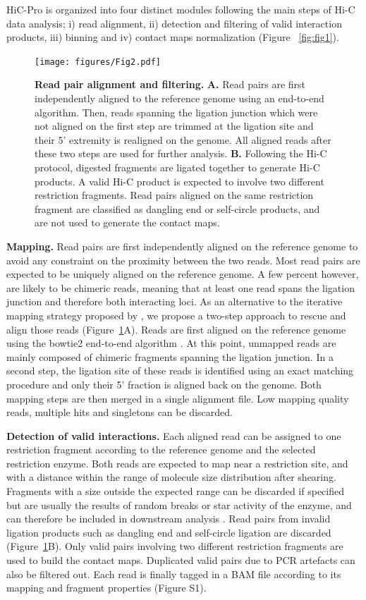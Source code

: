 HiC-Pro is organized into four distinct modules following the main steps of
Hi-C data analysis; i) read alignment, ii) detection and filtering of valid
interaction products, iii) binning and iv) contact maps normalization (Figure
~\ref{fig:fig1}).

\begin{figure}
\texttt{[image: figures/Fig2.pdf]}
\caption{\textbf{Read pair alignment and filtering.} \textbf{A.} Read pairs are first
independently aligned to the reference genome using an end-to-end algorithm.
Then, reads spanning the ligation junction which were not aligned on the first
step are trimmed at the ligation site and their 5’ extremity is realigned on
the genome. All aligned reads after these two steps are used for further
analysis. \textbf{B.} Following the Hi-C protocol, digested fragments are ligated
together to generate Hi-C products. A valid Hi-C product is expected to
involve two different restriction fragments. Read pairs aligned on the same
restriction fragment are classified as dangling end or self-circle products,
and are not used to generate the contact maps.}
\label{fig:fig2}
\end{figure}



\textbf{Mapping.} Read pairs are first independently aligned on the reference
genome to avoid any constraint on the proximity between the two reads. Most
read pairs are expected to be uniquely aligned on the reference genome. A few
percent however, are likely to be chimeric reads, meaning that at least one
read spans the ligation junction and therefore both interacting loci. As an
alternative to the iterative mapping strategy proposed by
\citet{imakaev:iterative},
we propose a two-step approach to rescue and align those reads
(Figure~\ref{fig:fig2}A).
Reads are first aligned on the reference genome using the bowtie2 end-to-end
algorithm \citep{langmead:fast}. At this point, unmapped reads are mainly composed of chimeric
fragments spanning the ligation junction. In a second step, the ligation site
of these reads is identified using an exact matching procedure and only their
5’ fraction is aligned back on the genome. Both mapping steps are then merged
in a single alignment file. Low mapping quality reads, multiple hits and
singletons can be discarded.

\textbf{Detection of valid interactions.} Each aligned read can be assigned to
one restriction fragment according to the reference genome and the selected
restriction enzyme. Both reads are expected to map near a restriction site,
and with a distance within the range of molecule size distribution after
shearing. Fragments with a size outside the expected range can be discarded if
specified but are usually the results of random breaks or star activity of the
enzyme, and can therefore be included in downstream analysis
\citep{imakaev:iterative}. Read pairs
from invalid ligation products such as dangling end and self-circle ligation
are discarded (Figure~\ref{fig:fig2}B). Only valid pairs involving two different
restriction fragments are used to build the contact maps. Duplicated valid
pairs due to PCR artefacts can also be filtered out. Each read is finally
tagged in a BAM file according to its mapping and fragment properties (Figure
S1).

